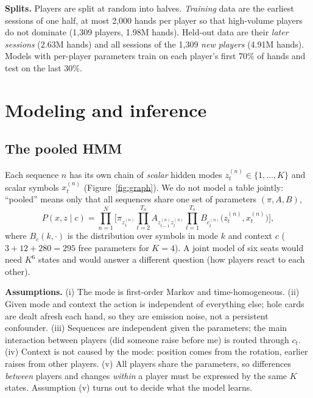 \textbf{Splits.} Players are split at random into halves. \emph{Training} data are the earliest sessions of one half, at most 2{,}000 hands per player so that high-volume players do not dominate (1{,}309 players, 1.98M hands). Held-out data are their \emph{later sessions} (2.63M hands) and all sessions of the 1{,}309 \emph{new players} (4.91M hands). Models with per-player parameters train on each player's first 70\% of hands and test on the last 30\%.

\section{Modeling and inference}
\subsection{The pooled HMM}
Each sequence $n$ has its own chain of \emph{scalar} hidden modes $z^{(n)}_t\in\{1,\dots,K\}$ and scalar symbols $x^{(n)}_t$ (Figure~\ref{fig:graph}). We do not model a table jointly: ``pooled'' means only that all sequences share one set of parameters $(\pi,A,B)$,
\begin{equation}
P(x,z\mid c)=\prod_{n=1}^{N}\Big[\pi_{z^{(n)}_1}\prod_{t=2}^{T_n}A_{z^{(n)}_{t-1}z^{(n)}_t}\prod_{t=1}^{T_n}B_{c^{(n)}_t}\big(z^{(n)}_t,x^{(n)}_t\big)\Big],
\label{eq:joint}
\end{equation}
where $B_c(k,\cdot)$ is the distribution over symbols in mode $k$ and context $c$ ($3+12+280=295$ free parameters for $K=4$). A joint model of six seats would need $K^6$ states and would answer a different question (how players react to each other).

\noindent\begin{minipage}[t]{0.53\linewidth}\vspace{0pt}
\setlength{\parindent}{0pt}\textbf{Assumptions.} (i) The mode is first-order Markov and time-homogeneous. (ii) Given mode and context the action is independent of everything else; hole cards are dealt afresh each hand, so they are emission noise, not a persistent confounder. (iii) Sequences are independent given the parameters; the main interaction between players (did someone raise before me) is routed through $c_t$. (iv) Context is not caused by the mode: position comes from the rotation, earlier raises from other players. (v) All players share the parameters, so differences \emph{between} players and changes \emph{within} a player must be expressed by the same $K$ states. Assumption (v) turns out to decide what the model learns.
\end{minipage}\hfill
\begin{minipage}[t]{0.44\linewidth}\vspace{2pt}
\centering
\resizebox{\linewidth}{!}{}
\label{fig:graph}
\end{minipage}

